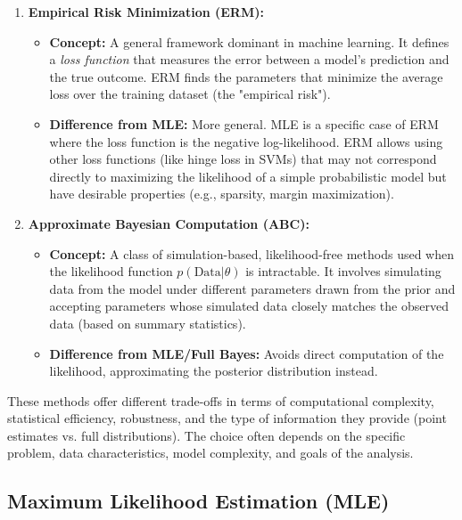 \documentclass{article}
\begin{document}
\begin{enumerate}
    \item \textbf{Empirical Risk Minimization (ERM):}
        \begin{itemize}[label=\textbullet, leftmargin=*]
            \item \textbf{Concept:} A general framework dominant in machine learning. It defines a \emph{loss function} that measures the error between a model's prediction and the true outcome. ERM finds the parameters that minimize the average loss over the training dataset (the "empirical risk").
            \item \textbf{Difference from MLE:} More general. MLE is a specific case of ERM where the loss function is the negative log-likelihood. ERM allows using other loss functions (like hinge loss in SVMs) that may not correspond directly to maximizing the likelihood of a simple probabilistic model but have desirable properties (e.g., sparsity, margin maximization).
        \end{itemize}

    \item \textbf{Approximate Bayesian Computation (ABC):}
        \begin{itemize}[label=\textbullet, leftmargin=*]
            \item \textbf{Concept:} A class of simulation-based, likelihood-free methods used when the likelihood function $p(\text{Data} | \theta)$ is intractable. It involves simulating data from the model under different parameters drawn from the prior and accepting parameters whose simulated data closely matches the observed data (based on summary statistics).
            \item \textbf{Difference from MLE/Full Bayes:} Avoids direct computation of the likelihood, approximating the posterior distribution instead.
        \end{itemize}

\end{enumerate}

These methods offer different trade-offs in terms of computational complexity, statistical efficiency, robustness, and the type of information they provide (point estimates vs. full distributions). The choice often depends on the specific problem, data characteristics, model complexity, and goals of the analysis.




\subsection{Maximum Likelihood Estimation (MLE)}
\end{document}
